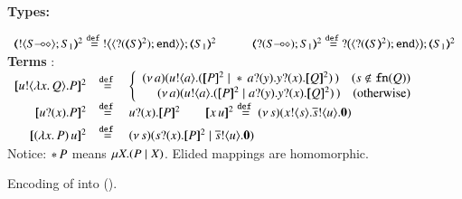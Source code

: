 \begin{figure}[t]
{\bf Types:}

$
	\begin{array}{c}
		\tmap{\btout{\lhot{S}}S_1}{2} \defeq \bbtout{\chtype{\btinp{\tmap{S}{2}}\tinact}}\tmap{S_1}{2}
		\qquad
		\quad
		\tmap{\btinp{\lhot{S}}S_1}{2} \defeq \bbtinp{\chtype{\btinp{\tmap{S}{2}}\tinact}}\tmap{S_1}{2}
	\end{array}
$
\\[2mm]
{\bf Terms} :
\\
$
\begin{array}{rcll}
	\pmap{\bout{u}{\abs{x}{Q}} P}{2} & \defeq  &
	\left\{
	\begin{array}{r}
		\newsp{a}{\bout{u}{a} (\pmap{P}{2} \Par \repl{} \binp{a}{y} \binp{y}{x} \pmap{Q}{2})\,}\quad
		(s \notin \fn{Q})
		\\
		\newsp{a}{\bout{u}{a} (\pmap{P}{2} \Par \binp{a}{y} \binp{y}{x} \pmap{Q}{2})\,}\quad
		\textrm{(otherwise)} %
	\end{array}
	\right.
	\\[1mm]

	\pmap{\binp{u}{x} P}{2} &\defeq&  \binp{u}{x} \pmap{P}{2}
	\qquad
	\pmap{\appl{x}{u}}{2} \defeq \newsp{s}{\bout{x}{s} \bout{\dual{s}}{u} \inact}
	\\[1mm]

	\pmap{\appl{(\abs{x}{P})}{u}}{2} & \defeq & %
	\newsp{s}{\binp{s}{x} \pmap{P}{2} \Par \bout{\dual{s}}{u} \inact}
\end{array}
$
\\[2mm]
{Notice: $\repl{} P$ means $\recp{X}{(P \Par \rvar{X})}$. Elided mappings are homomorphic.}
\vspace{-1mm}
\caption{Encoding of \HOp into \sessp (). \label{f:enc:ho_to_sessp}}
\vspace{-1mm}
\end{figure}

